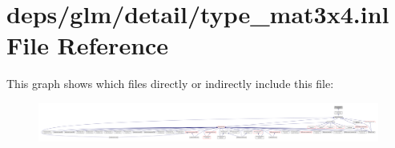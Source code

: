 \hypertarget{type__mat3x4_8inl}{}\section{deps/glm/detail/type\+\_\+mat3x4.inl File Reference}
\label{type__mat3x4_8inl}
This graph shows which files directly or indirectly include this file\+:
\nopagebreak
\begin{figure}[H]
\begin{center}
\leavevmode
\includegraphics[width=350pt]{d1/db7/type__mat3x4_8inl__dep__incl}
\end{center}
\end{figure}
